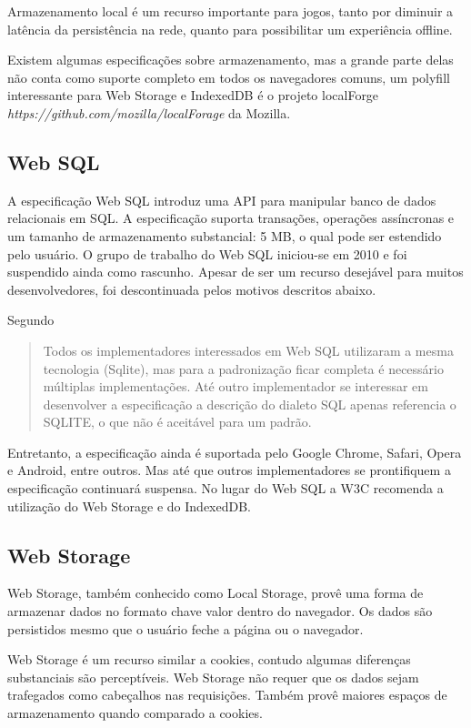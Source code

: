Armazenamento local é um recurso importante para jogos, tanto por
diminuir a latência da persistência na rede, quanto para possibilitar
um experiência offline.

Existem algumas especificações sobre armazenamento, mas a grande
parte delas não conta como suporte completo em todos os navegadores
comuns, um polyfill interessante para Web Storage  e IndexedDB é o
projeto localForge \textit{https://github.com/mozilla/localForage} da
Mozilla.

\subsection{Web SQL}

A especificação Web SQL introduz uma API para manipular banco de
dados relacionais em SQL. A especificação suporta transações,
operações assíncronas e um tamanho de armazenamento substancial: 5
MB, o qual pode ser estendido pelo usuário. O grupo de trabalho do Web
SQL iniciou-se em 2010 e foi suspendido ainda como rascunho. Apesar de
ser um recurso desejável para muitos desenvolvedores, foi descontinuada
pelos motivos descritos abaixo.

Segundo \citet{diveIntohtml}
\begin{quote}
Todos os implementadores interessados em Web SQL utilizaram a mesma
tecnologia (Sqlite), mas para a padronização ficar completa é
necessário múltiplas implementações. Até outro implementador se
interessar em desenvolver a especificação a descrição do dialeto SQL
apenas referencia o SQLITE, o que não é aceitável para um padrão.
\end{quote}

Entretanto, a especificação ainda é suportada pelo Google
Chrome, Safari, Opera e Android, entre outros. Mas até que outros
implementadores se prontifiquem a especificação continuará suspensa.
No lugar do Web SQL a W3C recomenda a utilização do Web Storage e do
IndexedDB.

\subsection{Web Storage}

Web Storage, também conhecido como Local Storage, provê uma forma de
armazenar dados no formato chave valor dentro do navegador. Os dados são
persistidos mesmo que o usuário feche a página ou o navegador.

Web Storage é um recurso similar a cookies, contudo algumas diferenças
substanciais são perceptíveis. Web Storage não requer que os dados
sejam trafegados como cabeçalhos nas requisições. Também provê
maiores espaços de armazenamento quando comparado a cookies.

